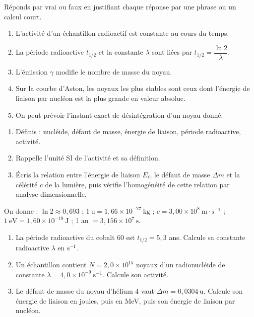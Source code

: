 \documentclass[11pt]{article}
\begin{document}
\begin{exercice}
Réponds par vrai ou faux en justifiant chaque réponse par une phrase ou un calcul court.
\begin{enumerate}
\item L'activité d'un échantillon radioactif est constante au cours du temps.
\item La période radioactive $t_{1/2}$ et la constante $\lambda$ sont liées par $t_{1/2} = \dfrac{\ln 2}{\lambda}$.
\item L'émission $\gamma$ modifie le nombre de masse du noyau.
\item Sur la courbe d'Aston, les noyaux les plus stables sont ceux dont l'énergie de liaison par nucléon est la plus grande en valeur absolue.
\item On peut prévoir l'instant exact de désintégration d'un noyau donné.
\end{enumerate}
\end{exercice}

\begin{exercice}
\begin{enumerate}
\item Définis : nucléide, défaut de masse, énergie de liaison, période radioactive, activité.
\item Rappelle l'unité SI de l'activité et sa définition.
\item Écris la relation entre l'énergie de liaison $E_\ell$, le défaut de masse $\Delta m$ et la célérité $c$ de la lumière, puis vérifie l'homogénéité de cette relation par analyse dimensionnelle.
\end{enumerate}
\end{exercice}

\begin{exercice}
On donne : $\ln 2 \approx 0,693$ ; $1\ \mathrm{u} = 1,66\times 10^{-27}\ \mathrm{kg}$ ; $c = 3,00\times 10^{8}\ \mathrm{m\cdot s^{-1}}$ ; $1\ \mathrm{eV} = 1,60\times 10^{-19}\ \mathrm{J}$ ; 1 an $= 3,156\times 10^{7}\ \mathrm{s}$.
\begin{enumerate}
\item La période radioactive du cobalt 60 est $t_{1/2} = 5,3$ ans. Calcule sa constante radioactive $\lambda$ en $\mathrm{s^{-1}}$.
\item Un échantillon contient $N = 2,0\times 10^{15}$ noyaux d'un radionucléide de constante $\lambda = 4,0\times 10^{-9}\ \mathrm{s^{-1}}$. Calcule son activité.
\item Le défaut de masse du noyau d'hélium 4 vaut $\Delta m = 0,0304\ \mathrm{u}$. Calcule son énergie de liaison en joules, puis en MeV, puis son énergie de liaison par nucléon.
\end{enumerate}
\end{exercice}
\end{document}
